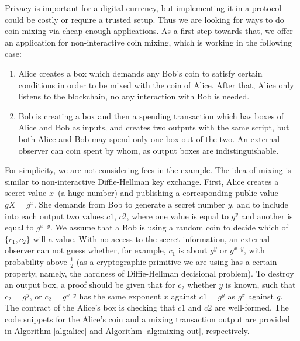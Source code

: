  Privacy is important for a digital currency, but implementing it in a protocol could be costly or require a trusted
 setup. Thus we are looking for ways to do coin mixing via cheap enough applications. As a first step towards that, we
 offer an application for non-interactive coin mixing, which is working in the following case:
 \begin{enumerate}
    \item{} Alice creates a box which demands any Bob's coin to satisfy certain conditions in order to be mixed with
    the coin of Alice. After that, Alice only listens to the blockchain, no any interaction with Bob is needed.
    \item{} Bob is creating a box and then a spending transaction which has boxes of Alice and Bob as inputs,
     and creates two outputs with the same script, but both Alice and Bob may spend only one box out of the two.
     An external observer can coin spent by whom, as output boxes are indistinguishable.
 \end{enumerate}

 For simplicity, we are not considering fees in the example. The idea of mixing is similar to non-interactive
 Diffie-Hellman key exchange. First, Alice creates a secret value $x$~(a huge number) and publishing a corresponding
 public value $gX = g^x$. She demands from Bob to generate a secret number $y$, and to include into each output two
 values $c1$, $c2$, where one value is equal to $g^y$ and another is equal to $g^{x \cdot y}$. We assume that a Bob is using
 a random coin to decide which of $\{c_1, c_2\}$ will a value. With no access to the secret information, an external
 observer can not guess whether, for example, $c_1$ is about $g^y$ or $g^{x \cdot y}$, with probability above
 $\frac{1}{2}$ (as a cryptographic primitive we are using has a certain property, namely, the hardness of
 Diffie-Hellman decisional problem). To destroy an output box, a proof should be given that for $c_2$ whether $y$ is known,
  such that $c_2 = g^y$, or $c_2 = g^{x \cdot y}$ has the same exponent $x$ against $c1 = g^y$ as $g^x$ against $g$.
 The contract of the Alice's box is checking that $c1$ and $c2$ are well-formed. The code snippets for the Alice's coin and
 a mixing transaction output are provided in Algorithm \ref{alg:alice} and Algorithm \ref{alg:mixing-out}, respectively.

